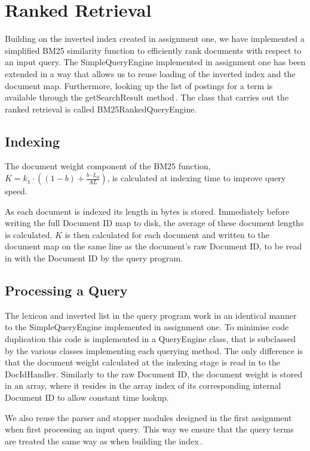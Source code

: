 
\section{Ranked Retrieval}
\label{sec:rankedRetrieval}
Building on the inverted index created in assignment one, we have implemented a simplified BM25 similarity function to efficiently rank documents with respect to an input query. The SimpleQueryEngine implemented in assignment one has been extended in a way that allows us to reuse loading of the inverted index and the document map. Furthermore, looking up the list of postings for a term is available through the getSearchResult method\,\cite{dahlsmith13}. The class that carries out the ranked retrieval is called BM25RankedQueryEngine.

\subsection*{Indexing}
The document weight component of the BM25 function, \(K = k_1 \cdot \left( \left(1 - b\right) + \frac{b \cdot L_d}{AL}\right)\), is calculated at indexing time to improve query speed.

As each document is indexed its length in bytes is stored. Immediately before writing the full Document ID map to disk, the average of these document lengths is calculated. \(K\) is then calculated for each document and written to the document map on the same line as the document's raw Document ID, to be read in with the Document ID by the query program.

\subsection*{Processing a Query}
The lexicon and inverted list in the query program work in an identical manner to the SimpleQueryEngine implemented in assignment one. To minimise code duplication this code is implemented in a QueryEngine class, that is subclassed by the various classes implementing each querying method. The only difference is that the document weight calculated at the indexing stage is read in to the DocIdHandler. Similarly to the raw Document ID, the document weight is stored in an array, where it resides in the array index of its corresponding internal Document ID to allow constant time lookup.

We also reuse the parser and stopper modules designed in the first assignment when first processing an input query. This way we ensure that the query terms are treated the same way as when building the index\,\cite{dahlsmith13}.

